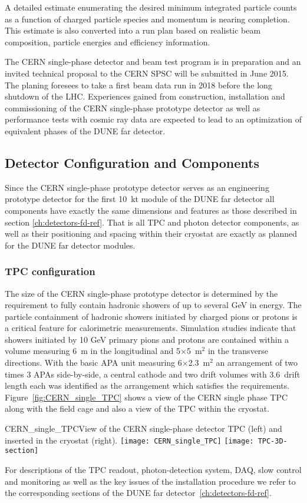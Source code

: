 A detailed estimate enumerating the desired minimum integrated
particle counts as a function of charged particle species and momentum
is nearing completion. This estimate is also converted into a run plan
based on realistic beam composition, particle energies and efficiency
information.

The CERN single-phase detector and beam test program is in preparation
and an invited technical proposal\cite{CERN_single-phase_proposal} to
the CERN SPSC will be submitted in June 2015. The planing foresees to
take a first beam data run in 2018 before the long shutdown of the
LHC. Experiences gained from construction, installation and
commissioning of the CERN single-phase prototype detector as well as
performance tests with cosmic ray data are expected to lead to an
optimization of equivalent phases of the DUNE far detector.

\subsection{Detector Configuration and Components}

Since the CERN single-phase prototype detector serves as an
engineering prototype detector for the first 10~kt module of the
DUNE far detector all components have exactly the same dimensions and
features as those described in section \ref{ch:detectors-fd-ref}. That
is all TPC and photon detector components, as well as their
positioning and spacing within their cryostat are exactly as planned
for the DUNE far detector modules.

\subsubsection{TPC configuration}

The size of the CERN single-phase prototype detector is determined by
the requirement to fully contain hadronic showers of up to several GeV
in energy.  The particle containment of hadronic showers initiated by
charged pions or protons is a critical feature for calorimetric
measurements. Simulation studies indicate that showers initiated by 10
GeV primary pions and protons are contained within a volume measuring
6~m in the longitudinal and 5$\times$5~m$^2$ in the transverse
directions. With the basic APA unit measuring 6$\times$2.3~m$^2$ an
arrangement of two times 3 APAs side-by-side, a central cathode and
two drift volumes with 3.6~drift length each was identified as the
arrangement which satisfies the
requirements. Figure~\ref{fig:CERN_single_TPC} shows a view of the
CERN single phase TPC along with the field cage and also a view of the
TPC within the cryostat.
%
\begin{cdrfigure}{CERN_single_TPC}{View of the CERN 
single-phase detector TPC (left) and inserted in the cryostat (right). }
\texttt{[image: CERN\_single\_TPC]}
\texttt{[image: TPC-3D-section]}
\end{cdrfigure}
%
For descriptions of the TPC readout, photon-detection system, DAQ,
slow control and monitoring as well as the key issues of the
installation procedure we refer to the corresponding sections of the
DUNE far detector~\ref{ch:detectors-fd-ref}.

